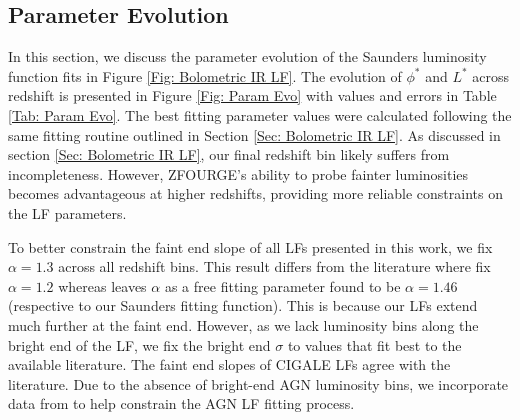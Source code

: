 \subsection{Parameter Evolution} \label{Sec: Parameter Evolution}
In this section, we discuss the parameter evolution of the Saunders luminosity function fits in Figure \ref{Fig: Bolometric IR LF}. The evolution of $\phi^{*}$ and $L^{*}$ across redshift is presented in Figure \ref{Fig: Param Evo} with values and errors in Table \ref{Tab: Param Evo}. The best fitting parameter values were calculated following the same fitting routine outlined in Section \ref{Sec: Bolometric IR LF}. As discussed in section \ref{Sec: Bolometric IR LF}, our final redshift bin likely suffers from incompleteness. However, ZFOURGE's ability to probe fainter luminosities becomes advantageous at higher redshifts, providing more reliable constraints on the LF parameters.

To better constrain the faint end slope of all LFs presented in this work, we fix $\alpha=1.3$ across all redshift bins. This result differs from the literature where \cite{rodighiero_mid-_2010, gruppioni_herschel_2013} fix $\alpha=1.2$ whereas \cite{fu_decomposing_2010} leaves $\alpha$ as a free fitting parameter found to be $\alpha=1.46$ (respective to our Saunders fitting function). This is because our LFs extend much further at the faint end. However, as we lack luminosity bins along the bright end of the LF, we fix the bright end $\sigma$ to values that fit best to the available literature. The faint end slopes of CIGALE LFs agree with the literature. Due to the absence of bright-end AGN luminosity bins, we incorporate data from \cite{thorne_deep_2022} to help constrain the AGN LF fitting process.

